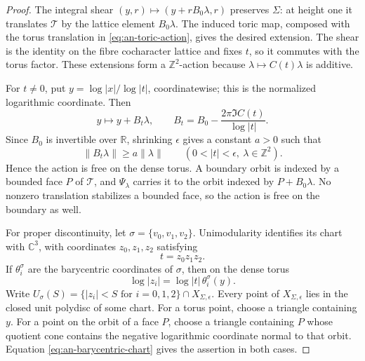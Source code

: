 \documentclass[11pt]{article}
\theoremstyle{definition}
\theoremstyle{remark}
\numberwithin{equation}{section}
\newcommand{\CC}{\mathbb C}
\newcommand{\ZZ}{\mathbb Z}
\begin{document}
\begin{proof}
The integral shear $(y,r)\mapsto(y+rB_0\lambda,r)$
preserves $\Sigma$: at height one it translates $\mathcal T$ by the
lattice element $B_0\lambda$.  The induced toric map, composed with the
torus translation in \eqref{eq:an-toric-action}, gives the desired
extension.  The shear is the identity on the fibre cocharacter lattice and
fixes $t$, so it commutes with the torus factor.  These extensions form a
$\ZZ^2$-action because $\lambda\mapsto C(t)\lambda$ is additive.

For $t\ne0$, put $y=\log|x|/\log|t|$, coordinatewise; this is the
normalized logarithmic coordinate.  Then
\begin{equation}\label{eq:an-log-coordinate-translation}
 y\longmapsto y+B_t\lambda,
 \qquad
 B_t=B_0-\frac{2\pi\Im C(t)}{\log|t|}.
\end{equation}
Since $B_0$ is invertible over $\mathbb R$, shrinking $\epsilon$
gives a constant $a>0$ such that
\begin{equation}\label{eq:an-singular-value-bound}
 \|B_t\lambda\|\geq a\|\lambda\|
 \qquad(0<|t|<\epsilon,\ \lambda\in\ZZ^2).
\end{equation}
Hence the action is free on the dense torus.  A boundary
orbit is indexed by a bounded face $P$ of $\mathcal T$, and
$\Psi_\lambda$ carries it to the orbit indexed by
$P+B_0\lambda$.  No nonzero translation stabilizes a bounded face, so
the action is free on the boundary as well.

For proper discontinuity, let
$\sigma=\{v_0,v_1,v_2\}$.  Unimodularity identifies its chart with
$\CC^3$, with coordinates $z_0,z_1,z_2$ satisfying
\begin{equation}\label{eq:an-local-t-equation}
 t=z_0z_1z_2.
\end{equation}
If $\theta_i^\sigma$ are the barycentric coordinates of $\sigma$, then
on the dense torus
\begin{equation}\label{eq:an-barycentric-chart}
 \log|z_i|=\log|t|\,\theta_i^\sigma(y).
\end{equation}
Write
$U_\sigma(S)=\{|z_i|<S\text{ for }i=0,1,2\}
\cap X_{\Sigma,\epsilon}$.
Every point of $X_{\Sigma,\epsilon}$ lies in the closed unit polydisc of
some chart.  For a torus point, choose a triangle containing $y$.  For a
point on the orbit of a face $P$, choose a triangle containing $P$ whose
quotient cone contains the negative logarithmic coordinate normal to that
orbit.  Equation \eqref{eq:an-barycentric-chart} gives the assertion in
both cases.


\end{proof}
\end{document}
